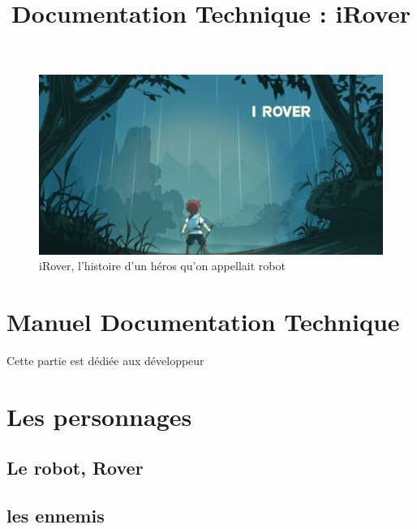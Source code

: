 \documentclass[a4paper 12pts]{article}
\title{Documentation Technique : iRover}
\author{}
\begin{document}
\maketitle


\begin{figure}[h]
   \includegraphics[width=350pt]{Illustration/proj_irover.jpg}
	\caption{iRover, l'histoire d'un héros qu'on appellait robot}
\end{figure}



\newpage


\renewcommand{\contentsname}{Sommaire} 
\tableofcontents

\newpage





\section{Manuel Documentation Technique}


\vspace{2cm}

Cette partie est dédiée aux développeur


\section{Les personnages}

\subsection{Le robot, Rover}

\subsection{les ennemis}
\end{document}
